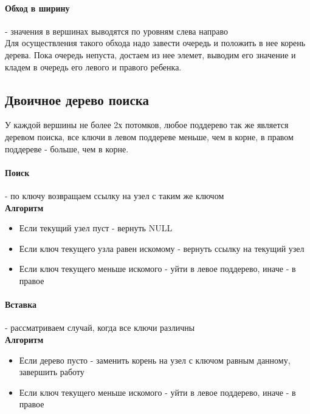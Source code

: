 \documentclass[a4paper,10pt]{article}
\begin{document}
\paragraph{Обход в ширину} - значения в вершинах выводятся по уровням слева направо\\
Для осуществления такого обхода надо завести очередь и положить в нее корень дерева. Пока очередь непуста, достаем из нее элемет, выводим его значение и кладем в очередь его левого и правого ребенка.
\subsection{Двоичное дерево поиска}
У каждой вершины не более 2х потомков, любое поддерево так же является деревом поиска, все ключи в левом поддереве меньше, чем в корне, в правом поддереве - больше, чем в корне. 
\paragraph{Поиск} - по ключу возвращаем ссылку на узел с таким же ключом\\
\textbf{Алгоритм} \\
\begin{itemize}
	\item Если текущий узел пуст - вернуть NULL
	\item Если ключ текущего узла равен искомому - вернуть ссылку на текущий узел 
	\item Если ключ текущего меньше искомого - уйти в левое поддерево, иначе - в правое
\end{itemize}
\paragraph{Вставка} - рассматриваем случай, когда все ключи различны\\
\textbf{Алгоритм}\\
\begin{itemize}
	\item Если дерево пусто - заменить корень на узел с ключом равным данному, завершить работу
	\item Если ключ текущего меньше искомого - уйти в левое поддерево, иначе - в правое
\end{itemize}
\end{document}
